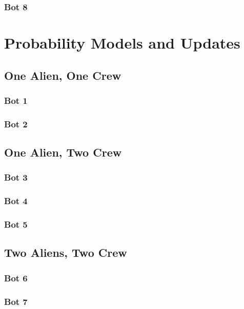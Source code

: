 \documentclass[11pt]{article}
\begin{document}
\subsubsection{Bot 8}



\section{Probability Models and Updates}

\subsection{One Alien, One Crew}

\subsubsection{Bot 1}

\subsubsection{Bot 2}

\subsection{One Alien, Two Crew}

\subsubsection{Bot 3}

\subsubsection{Bot 4}

\subsubsection{Bot 5}

\subsection{Two Aliens, Two Crew}

\subsubsection{Bot 6}

\subsubsection{Bot 7}
\end{document}
